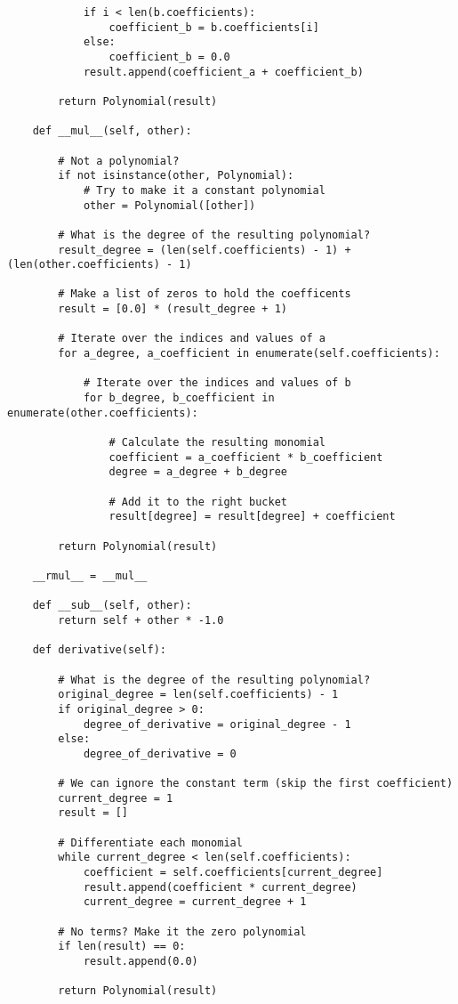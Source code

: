\begin{Verbatim}
            if i < len(b.coefficients):
                coefficient_b = b.coefficients[i]
            else:
                coefficient_b = 0.0
            result.append(coefficient_a + coefficient_b)
            
        return Polynomial(result)

    def __mul__(self, other):

        # Not a polynomial?
        if not isinstance(other, Polynomial):
            # Try to make it a constant polynomial
            other = Polynomial([other])
        
        # What is the degree of the resulting polynomial?
        result_degree = (len(self.coefficients) - 1) + (len(other.coefficients) - 1)

        # Make a list of zeros to hold the coefficents
        result = [0.0] * (result_degree + 1)

        # Iterate over the indices and values of a
        for a_degree, a_coefficient in enumerate(self.coefficients):

            # Iterate over the indices and values of b
            for b_degree, b_coefficient in enumerate(other.coefficients):

                # Calculate the resulting monomial
                coefficient = a_coefficient * b_coefficient
                degree = a_degree + b_degree
            
                # Add it to the right bucket
                result[degree] = result[degree] + coefficient
            
        return Polynomial(result)

    __rmul__ = __mul__

    def __sub__(self, other):
        return self + other * -1.0
    
    def derivative(self):

        # What is the degree of the resulting polynomial?
        original_degree = len(self.coefficients) - 1
        if original_degree > 0:
            degree_of_derivative = original_degree - 1
        else:
            degree_of_derivative = 0

        # We can ignore the constant term (skip the first coefficient)
        current_degree = 1
        result = []

        # Differentiate each monomial
        while current_degree < len(self.coefficients):
            coefficient = self.coefficients[current_degree]
            result.append(coefficient * current_degree)
            current_degree = current_degree + 1

        # No terms? Make it the zero polynomial
        if len(result) == 0:
            result.append(0.0)

        return Polynomial(result)
\end{Verbatim}

